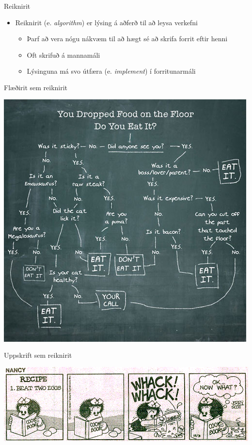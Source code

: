\documentclass{beamer}
\begin{document}
\begin{frame}{Reiknirit}
\begin{itemize}
 \item Reiknirit (e. \emph{algorithm}) er lýsing á aðferð til að leysa verkefni
 \begin{itemize}
  \item Þarf að vera nógu nákvæm til að hægt sé að skrifa forrit eftir henni
  \item Oft skrifuð á mannamáli
  \item Lýsinguna má svo útfæra (e. \emph{implement}) í forritunarmáli
 \end{itemize}
\end{itemize}
\end{frame}

\begin{frame}{Flæðirit sem reiknirit}
\begin{center}
\includegraphics[height=0.85\textheight]{Pics/flowchart-floorfood} 
\end{center}
\end{frame}

\begin{frame}{Uppskrift sem reiknirit}
\begin{center}
\includegraphics[width=\textwidth]{Pics/recipe} 
\end{center}
\end{frame}
\end{document}
